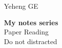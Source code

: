 \begin{titlepage} 
\AddToShipoutPictureBG*{\AtPageLowerLeft{%
  \color{accentcolour!75}\rule{.1\paperwidth}{\paperheight}}}
	\raggedright %

	\vspace*{\baselineskip} 
        
	\vspace{40mm}
        \hspace{15mm}
	{\Large Yeheng GE} 
	
	\vspace*{0.167\textheight} 
        \hspace{15mm}
	\textbf{\LARGE My notes series}\\[\baselineskip] 
	\hspace{15mm}
	{\textcolor{accentcolour}{\Huge Paper Reading}}\\[\baselineskip] 
	\hspace{15mm}
	{\Large Do not distracted}
	
	\vfill 

	
	\date{\today} 
	
	\vspace*{3\baselineskip} 

\end{titlepage}